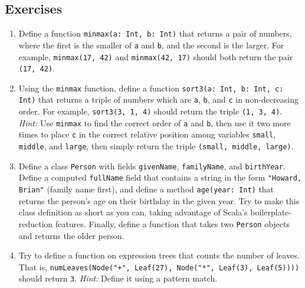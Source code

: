 \documentclass[11pt]{article}
\begin{document}
\subsection*{Exercises}
\begin{enumerate}
\item Define a function \verb|minmax(a: Int, b: Int)| that returns a pair of numbers, where the first is the smaller of \texttt{a} and \texttt{b}, and the second is the larger. For example, \verb|minmax(17, 42)| and \verb|minmax(42, 17)| should both return the pair \verb|(17, 42)|.

\item Using the \texttt{minmax} function, define a function \verb|sort3(a: Int, b: Int, c: Int)| that returns a triple of numbers which are \texttt{a}, \texttt{b}, and \texttt{c} in non-decreasing order. For example, \verb|sort3(3, 1, 4)| should return the triple \verb|(1, 3, 4)|. \textit{Hint:} Use \texttt{minmax} to find the correct order of \texttt{a} and \texttt{b}, then use it two more times to place \texttt{c} in the correct relative position among variables \texttt{small}, \texttt{middle}, and \texttt{large}, then simply return the triple \verb|(small, middle, large)|.

\item Define a class \texttt{Person} with fields \texttt{givenName}, \texttt{familyName}, and \texttt{birthYear}. Define a computed \texttt{fullName} field that contains a string in the form \verb|"Howard, Brian"| (family name first), and define a method \verb|age(year: Int)| that returns the person's age on their birthday in the given year. Try to make this class definition as short as you can, taking advantage of Scala's boilerplate-reduction features. Finally, define a function that takes two \texttt{Person} objects and returns the older person.

\item Try to define a function on expression trees that counts the number of leaves. That is, \verb|numLeaves(Node("+", Leaf(27), Node("*", Leaf(3), Leaf(5))))| should return \texttt{3}. \textit{Hint:} Define it using a pattern match.
\end{enumerate}
\end{document}
